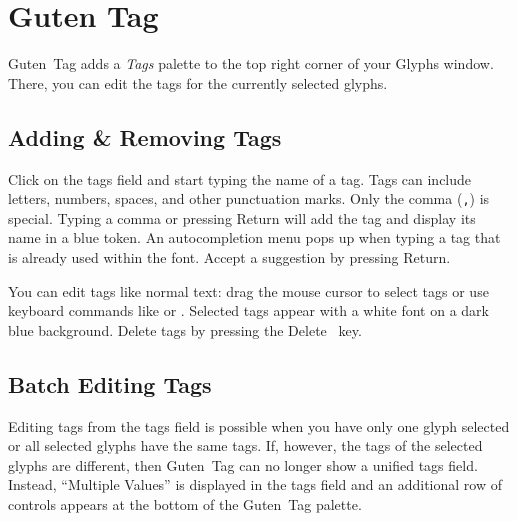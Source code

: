 \chapter{Guten Tag}%
\label{cha:guten_tag}

\noindent Guten~Tag adds a \emph{Tags} palette to the top right corner of your Glyphs window.
There, you can edit the tags for the currently selected glyphs.

\bigbreak\noindent%
\bigbreak

\section{Adding \& Removing Tags}%
\label{sec:adding_and_removing_tags}

\hfill
{}\hfill
{}

\medbreak\noindent Click on the tags field and start typing the name of a tag.
Tags can include letters, numbers, spaces, and other punctuation marks.
Only the comma (\texttt{,}) is special.
Typing a comma or pressing Return will add the tag and display its name in a blue token.
An autocompletion menu pops up when typing a tag that is already used within the font.
Accept a suggestion by pressing Return.

\noindent%
\hfill
{}\hfill
{}\hfill

\medbreak\noindent You can edit tags like normal text: drag the mouse cursor to select tags or use keyboard commands like  or .
Selected tags appear with a white font on a dark blue background.
Delete tags by pressing the Delete~ key.

\section{Batch Editing Tags}%
\label{sec:batch_editing_tags}

Editing tags from the tags field is possible when you have only one glyph selected or all selected glyphs have the same tags.
If, however, the tags of the selected glyphs are different, then Guten~Tag can no longer show a unified tags field.
Instead, \enquote{Multiple Values} is displayed in the tags field and an additional row of controls appears at the bottom of the Guten~Tag palette.

